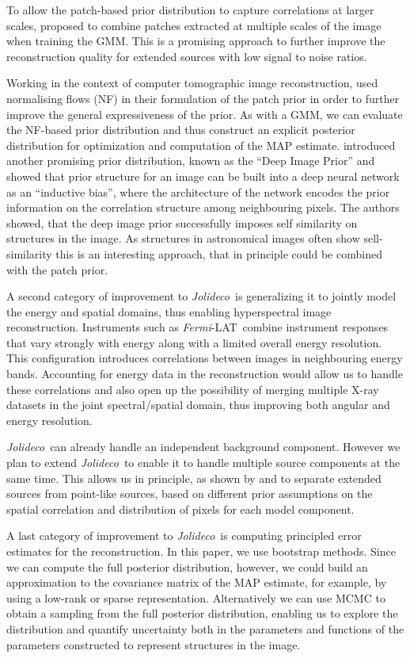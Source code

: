 \documentclass[twocolumn]{aastex631}
\newcommand{\fermi}{\textit{Fermi}-LAT~}
\newcommand{\jolideco}{\textit{Jolideco}~}
\newcommand{\xray}{X-ray\xspace}
\begin{document}
    
    To allow the patch-based prior distribution to capture correlations at larger scales,
    \cite{Papyan2015} proposed to combine patches extracted at multiple scales of the image when training the GMM. This is a promising approach to further improve the reconstruction quality for extended sources with low signal to noise ratios.
    
    Working in the context of computer tomographic image reconstruction, \cite{Altekrueger2022} used normalising flows (NF) in their formulation of the patch prior in order to further improve the general expressiveness of the prior. As with a GMM, we can evaluate the NF-based prior distribution and thus construct an explicit posterior distribution for optimization and computation of the MAP estimate. \citet{Ulyanov2017} introduced another promising prior distribution, known as the \enquote{Deep Image Prior} and showed that prior structure for an image can be built into a deep neural network as an \enquote{inductive bias}, where the architecture of the network encodes the prior information on the correlation structure among neighbouring pixels. The authors showed, that the deep image prior successfully imposes self similarity on structures in the image. As structures in astronomical images often show sell-similarity this is an interesting approach, that in principle could be combined with the patch prior.

    A second category of improvement to \jolideco is generalizing it to jointly model the energy and spatial domains, thus enabling hyperspectral image reconstruction. Instruments such as \fermi combine instrument responses that vary strongly with energy along with a limited overall energy resolution. This configuration introduces correlations between images in neighbouring energy bands. Accounting for energy data in the reconstruction would allow us to handle these correlations and also open up the possibility of merging multiple \xray datasets in the joint spectral/spatial domain,  thus improving both  angular and energy resolution. 

    \jolideco can already handle an independent background component. However we plan to extend \jolideco to enable it to handle multiple source components at the same time. This allows us in principle, as shown by \cite{Selig2015} and \citet{Pumpe2018} to separate extended sources from point-like sources, based on different prior assumptions on the spatial correlation and distribution of pixels for each model component. 

    A last category of improvement to \jolideco is computing principled error estimates for the reconstruction. In this paper, we use bootstrap methods. Since we can compute the full posterior distribution, however, we could build an approximation to the covariance matrix of the MAP estimate, for example, by using a low-rank or sparse representation.
    Alternatively we can use MCMC to obtain a sampling from the full posterior distribution, enabling us to explore the distribution and quantify  uncertainty both in the parameters and functions of the parameters constructed to represent structures in the image. 
    
\end{document}

